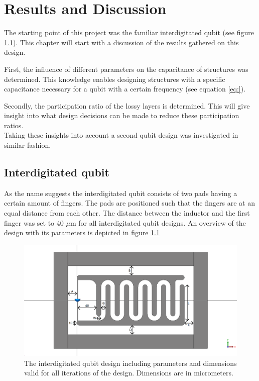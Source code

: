 \chapter{Results and Discussion}
The starting point of this project was the familiar interdigitated qubit (see figure \ref{fig:Yale_parameters2}). This chapter will start with a discussion of the results gathered on this design.



First, the influence of different parameters on the capacitance of structures was determined. This knowledge enables designing structures with a specific capacitance necessary for a qubit with a certain frequency (see equation \eqref{eq:}).


Secondly, the participation ratio of the lossy layers is determined. This will give insight into what design decisions can be made to reduce these participation ratios.\\
Taking these insights into account a second qubit design was investigated in similar fashion. 





\section{Interdigitated qubit}
As the name suggests the interdigitated qubit consists of two pads having a certain amount of fingers. The pads are positioned such that the fingers are at an equal distance from each other. The distance between the inductor and the first finger was set to 40 \(\mu\)m for all interdigitated qubit designs. An overview of the design with its parameters is depicted in figure \ref{fig:Yale_parameters2}

\begin{figure}
	\centering
	\includegraphics[width = \textwidth]{Figures/Yale_parameters2}
	\caption{The interdigitated qubit design including parameters and dimensions valid for all iterations of the design. Dimensions are in micrometers.}
	\label{fig:Yale_parameters2}
\end{figure}


